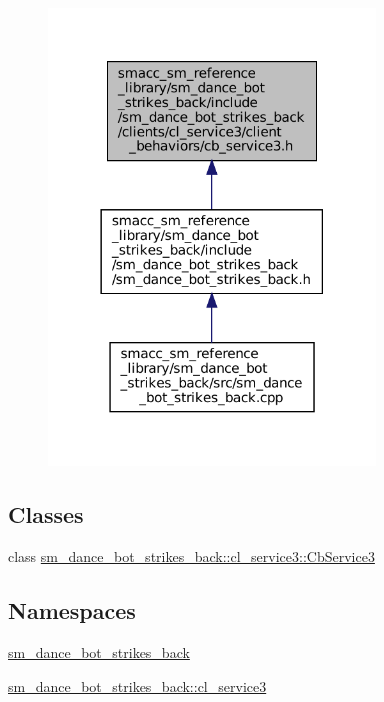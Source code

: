 \begin{figure}[H]
\begin{center}
\leavevmode
\includegraphics[width=246pt]{sm__dance__bot__strikes__back_2include_2sm__dance__bot__strikes__back_2clients_2cl__service3_2cl73eed8a2bb2499597dc2e61937ee571a}
\end{center}
\end{figure}
\subsection*{Classes}
\begin{DoxyCompactItemize}
\item 
class \hyperlink{classsm__dance__bot__strikes__back_1_1cl__service3_1_1CbService3}{sm\+\_\+dance\+\_\+bot\+\_\+strikes\+\_\+back\+::cl\+\_\+service3\+::\+Cb\+Service3}
\end{DoxyCompactItemize}
\subsection*{Namespaces}
\begin{DoxyCompactItemize}
\item 
 \hyperlink{namespacesm__dance__bot__strikes__back}{sm\+\_\+dance\+\_\+bot\+\_\+strikes\+\_\+back}
\item 
 \hyperlink{namespacesm__dance__bot__strikes__back_1_1cl__service3}{sm\+\_\+dance\+\_\+bot\+\_\+strikes\+\_\+back\+::cl\+\_\+service3}
\end{DoxyCompactItemize}
